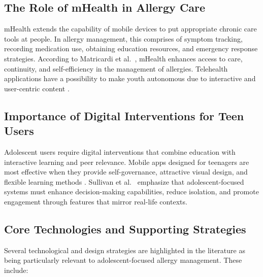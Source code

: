 \documentclass[MScCS]{uccthesis}
\begin{document}
\subsection{The Role of mHealth in Allergy Care}
mHealth extends the capability of mobile devices to put appropriate chronic care tools at people. In allergy management, this comprises of symptom tracking, recording medication use, obtaining education resources, and emergency response strategies. According to Matricardi et al.~\cite{matricardi2020mhealth}, mHealth enhances access to care, continuity, and self-efficiency in the management of allergies. Telehealth applications have a possibility to make youth autonomous due to interactive and user-centric content \cite{sullivan2024telehealth}.

\subsection{Importance of Digital Interventions for Teen Users}
Adolescent users require digital interventions that combine education with interactive learning and peer relevance. Mobile apps designed for teenagers are most effective when they provide self-governance, attractive visual design, and flexible learning methods \cite{perez2019mobile}. Sullivan et al.~\cite{sullivan2024telehealth} emphasize that adolescent-focused systems must enhance decision-making capabilities, reduce isolation, and promote engagement through features that mirror real-life contexts.

\subsection{Core Technologies and Supporting Strategies}
\label{sec:core-tech}

Several technological and design strategies are highlighted in the literature as being particularly relevant to adolescent-focused allergy management. These include:
\end{document}
